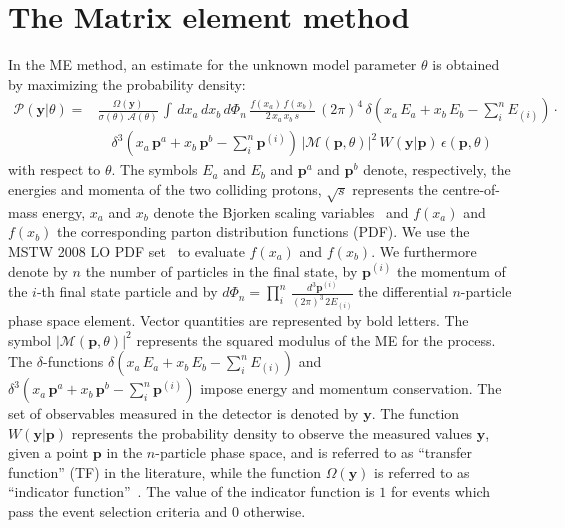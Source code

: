 \section{The Matrix element method}
\label{sec:mem}

In the ME method, an estimate for the unknown model parameter $\theta$
is obtained by maximizing the probability density:
\begin{align}
\mathcal{P}(\bm{y}|\theta) = & \frac{\Omega(\bm{y})}{\sigma(\theta) \,
\mathcal{A}(\theta)} \, \int \, dx_{a} \, dx_{b} \,
d\Phi_{n} \, \frac{f(x_{a}) \, f(x_{b})}{2 \, x_{a} \, x_{b} \, s} \, (2\pi)^{4} \,
\delta( x_{a} \, E_{a} + x_{b} \, E_{b} - \sum_{i}^{n}
E_{(i)}) \cdot \nonumber \\
 & \quad \delta^{3}( x_{a} \, \bm{p}^{a} + x_{b} \, \bm{p}^{b} - \sum_{i}^{n}
\bm{p}^{(i)}) \, 
  \vert \mathcal{M}(\bm{p},\theta) \vert^{2} \, W(\bm{y}|\bm{p}) \,
  \epsilon(\bm{p},\theta) 
\label{eq:mem}
\end{align}
with respect to $\theta$.
The symbols $E_{a}$ and $E_{b}$ and $\bm{p}^{a}$ and $\bm{p}^{b}$ denote, respectively, the energies and momenta of the two colliding protons,
$\sqrt{s}$ represents the centre-of-mass energy,
$x_{a}$ and $x_{b}$ denote the Bjorken scaling variables~\cite{Bjorkenx}
and $f(x_{a})$ and $f(x_{b})$ the corresponding parton distribution
functions (PDF).
We use the MSTW 2008 LO PDF set~\cite{MSTW} to evaluate $f(x_{a})$ and $f(x_{b})$.
We furthermore denote by $n$ the number of particles in the final state,
by $\bm{p}^{(i)}$ the momentum of the $i$-th final state particle
and by $d\Phi_{n} = \prod_{i}^{n} \,
\frac{d^{3}\bm{p}^{(i)}}{(2\pi)^{3} \, 2 E_{(i)}}$ the differential $n$-particle
phase space element.
Vector quantities are represented by bold letters.
The symbol $\vert \mathcal{M}(\bm{p},\theta) \vert^{2}$ represents the
squared modulus of the ME for
the process.
The $\delta$-functions $\delta( x_{a} \, E_{a} + x_{b} \, E_{b} - \sum_{i}^{n} E_{(i)})$
and $\delta^{3}( x_{a} \, \bm{p}^{a} + x_{b} \, \bm{p}^{b} - \sum_{i}^{n} \bm{p}^{(i)})$ 
impose energy and momentum conservation.
The set of observables measured in the
detector is denoted by $\bm{y}$.
The function $W(\bm{y}|\bm{p})$ represents the probability density to
observe the measured values $\bm{y}$, given a point $\bm{p}$ in the
$n$-particle phase space, and
is referred to as ``transfer function'' (TF) in the
literature, while the function $\Omega(\bm{y})$ is referred to as ``indicator function''~\cite{Fiedler:2010sg,Volobouev:2011vb}.
The value of the indicator function is $1$ for events which pass the event selection criteria and $0$ otherwise.
